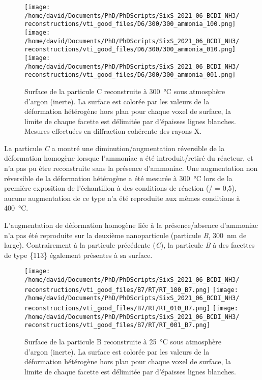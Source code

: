 \begin{figure}[!htb]
    \centering
    \texttt{[image: /home/david/Documents/PhD/PhDScripts/SixS\_2021\_06\_BCDI\_NH3/reconstructions/vti\_good\_files/D6/300/300\_ammonia\_100.png]}
    \texttt{[image: /home/david/Documents/PhD/PhDScripts/SixS\_2021\_06\_BCDI\_NH3/reconstructions/vti\_good\_files/D6/300/300\_ammonia\_010.png]}
    \texttt{[image: /home/david/Documents/PhD/PhDScripts/SixS\_2021\_06\_BCDI\_NH3/reconstructions/vti\_good\_files/D6/300/300\_ammonia\_001.png]}
    \caption{
        Surface de la particule C reconstruite à \qty{300}{\degreeCelsius} sous atmosphère d'argon (inerte).
        La surface est colorée par les valeurs de la déformation hétérogène hors plan pour chaque voxel de surface, la limite de chaque facette est délimitée par d'épaisses lignes blanches.
        Mesures effectuées en diffraction cohérente des rayons X.
    }
    \label{fig:D6FacetsFr}
\end{figure}

La particule \textit{C} a montré une diminution/augmentation réversible de la déformation homogène lorsque l'ammoniac a été introduit/retiré du réacteur, et n'a pas pu être reconstruite sans la présence d'ammoniac.
Une augmentation non réversible de la déformation hétérogène a été mesurée à \qty{300}{\degreeCelsius} lors de la première exposition de l'échantillon à des conditions de réaction (/ = 0,5), aucune augmentation de ce type n'a été reproduite aux mêmes conditions à \qty{400}{\degreeCelsius}.

L'augmentation de déformation homogène liée à la présence/absence d'ammoniac n'a pas été reproduite sur la deuxième nanoparticule (particule \textit{B}, \qty{300}{\nm} de large).
Contrairement à la particule précédente (\textit{C}), la particule \textit{B} à des facettes de type \{113\} également présentes à sa surface.

\begin{figure}[!htb]
    \centering
    \texttt{[image: /home/david/Documents/PhD/PhDScripts/SixS\_2021\_06\_BCDI\_NH3/reconstructions/vti\_good\_files/B7/RT/RT\_100\_B7.png]}
    \texttt{[image: /home/david/Documents/PhD/PhDScripts/SixS\_2021\_06\_BCDI\_NH3/reconstructions/vti\_good\_files/B7/RT/RT\_010\_B7.png]}
    \texttt{[image: /home/david/Documents/PhD/PhDScripts/SixS\_2021\_06\_BCDI\_NH3/reconstructions/vti\_good\_files/B7/RT/RT\_001\_B7.png]}
    \caption{
        Surface de la particule B reconstruite à \qty{25}{\degreeCelsius} sous atmosphère d'argon (inerte).
        La surface est colorée par les valeurs de la déformation hétérogène hors plan pour chaque voxel de surface, la limite de chaque facette est délimitée par d'épaisses lignes blanches.
    }
    \label{fig:B7FacetsFr}
\end{figure}

